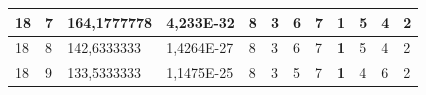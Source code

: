 \documentclass[conference]{IEEEtran}
\begin{document}
\begin{table}[]
\begin{tabular}{|llll|llllllll|}
\multicolumn{1}{|l|}{18}                                                             & \multicolumn{1}{l|}{7}                                                                 & \multicolumn{1}{l|}{164,1777778}                                                           & 4,233E-32                               & \multicolumn{1}{l|}{8}                                                           & \multicolumn{1}{l|}{3}                                                           & \multicolumn{1}{l|}{6}                                                           & \multicolumn{1}{l|}{7}                                                           & \multicolumn{1}{l|}{\textbf{1}}                                                  & \multicolumn{1}{l|}{5}                                                           & \multicolumn{1}{l|}{4}                                                           & 2                                   \\ \hline
\multicolumn{1}{|l|}{18}                                                             & \multicolumn{1}{l|}{8}                                                                 & \multicolumn{1}{l|}{142,6333333}                                                           & 1,4264E-27                              & \multicolumn{1}{l|}{8}                                                           & \multicolumn{1}{l|}{3}                                                           & \multicolumn{1}{l|}{6}                                                           & \multicolumn{1}{l|}{7}                                                           & \multicolumn{1}{l|}{\textbf{1}}                                                  & \multicolumn{1}{l|}{5}                                                           & \multicolumn{1}{l|}{4}                                                           & 2                                   \\ \hline
\multicolumn{1}{|l|}{18}                                                             & \multicolumn{1}{l|}{9}                                                                 & \multicolumn{1}{l|}{133,5333333}                                                           & 1,1475E-25                              & \multicolumn{1}{l|}{8}                                                           & \multicolumn{1}{l|}{3}                                                           & \multicolumn{1}{l|}{5}                                                           & \multicolumn{1}{l|}{7}                                                           & \multicolumn{1}{l|}{\textbf{1}}                                                  & \multicolumn{1}{l|}{4}                                                           & \multicolumn{1}{l|}{6}                                                           & 2                                   \\ \hline

\end{tabular}
\end{table}
\end{document}
